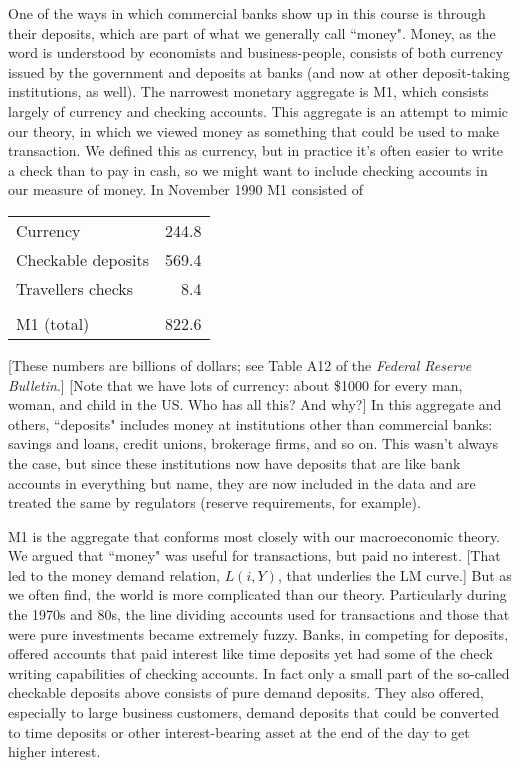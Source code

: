 \documentclass[letterpaper,12pt]{article}
\begin{document}
     One of the ways in which commercial banks show up in this course is
through their deposits, which are part of what we generally call ``money". Money, as the word is
understood by economists and business-people, consists of both currency issued by the government
and deposits at banks (and now at other deposit-taking institutions, as well).  The narrowest
monetary aggregate is M1, which consists largely of currency and checking accounts. This aggregate
is an attempt to mimic our theory, in which we viewed money as something that could be used to
make transaction.  We defined this as currency, but in practice it's often easier to write a check
than to pay in cash, so we might want to include checking accounts in our measure of money. In
November 1990 M1 consisted of
%
\begin{center}
\begin{tabular}{lr}
                        Currency             &   244.8   \\
                        Checkable deposits   &   569.4   \\
                        Travellers checks    &     8.4   \\
                                             &           \\
                        M1 (total)           &   822.6   \\
\end{tabular}
\end{center}
%
[These numbers are billions of dollars; see Table A12 of the {\em Federal Reserve Bulletin}.]
[Note that we have lots of currency:  about \$1000 for every man, woman, and child in the US.  Who
has all this?  And why?]  In this aggregate and others, ``deposits" includes money at institutions
other than commercial banks:  savings and loans, credit unions, brokerage firms, and so on.  This
wasn't always the case, but since these institutions now have deposits that are like bank accounts
in everything but name, they are now included in the data and are treated the same by regulators
(reserve requirements, for example).

     M1 is the aggregate that conforms most closely with our macroeconomic
theory.  We argued that ``money" was useful for transactions, but paid no interest.  [That led to
the money demand relation, $L(i,Y)$, that underlies the LM curve.]  But as we often find, the
world is more complicated than our theory.  Particularly during the 1970s and 80s, the line
dividing accounts used for transactions and those that were pure investments became extremely
fuzzy.  Banks, in competing for deposits, offered accounts that paid interest like time deposits
yet had some of the check writing capabilities of checking accounts.  In fact only a small part of
the so-called checkable deposits above consists of pure demand deposits.  They also offered,
especially to large business customers, demand deposits that could be converted to time deposits
or other interest-bearing asset at the end of the day to get higher interest.
\end{document}
